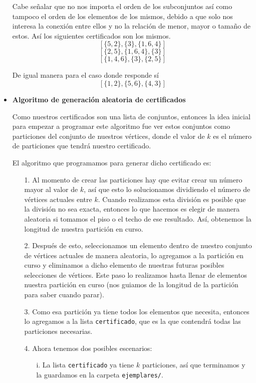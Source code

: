 \documentclass[12pt,letterpaper]{article}
\begin{document}
\begin{itemize}
    Cabe señalar que no nos importa el orden de los subconjuntos así como tampoco el orden de los elementos de los mismos, debido a que solo nos interesa la conexión entre ellos y no la relación de menor, mayor o tamaño de estos. Así los siguientes certificados son los mismos.
    $$[\{5,2\},\{3\},\{1,6,4\}]$$
    $$[\{2,5\},\{1,6,4\},\{3\}]$$
    $$[\{1,4,6\},\{3\},\{2,5\}]$$
    
    De igual manera para el caso donde responde sí
    $$[\{1,2\},\{5,6\},\{4,3\}]$$

    \item \textbf{Algoritmo de generación aleatoria de certificados}
    
    Como nuestros certificados son una lista de conjuntos, entonces la idea 
    inicial para empezar a programar este algoritmo fue ver estos conjuntos 
    como particiones del conjunto de nuestros vértices, donde el valor de 
    $k$ es el número de particiones que tendrá nuestro certificado.

    El algoritmo que programamos para generar dicho certificado es:
    \begin{itemize}
        \item[1.] Al momento de crear las particiones hay que evitar crear un 
        número mayor al valor de $k$, así que esto lo solucionamos dividiendo 
        el número de vértices actuales entre $k$. Cuando realizamos esta 
        división es posible que la división no sea exacta, entonces lo que 
        hacemos es elegir de manera aleatoria si tomamos el piso o el techo de 
        ese resultado. Así, obtenemos la longitud de nuestra partición en curso. 

        \item[2.] Después de esto, seleccionamos un elemento dentro de nuestro 
        conjunto de vértices actuales de manera aleatoria, lo agregamos a la 
        partición en curso y eliminamos a dicho elemento de nuestras 
        futuras posibles selecciones de vértices. Este paso lo realizamos 
        hasta llenar de elementos nuestra partición en curso (nos guiamos 
        de la longitud de la partición para saber cuando parar). 

        \item[3.] Como esa partición ya tiene todos los elementos que necesita, 
        entonces lo agregamos a la lista \texttt{certificado}, que es la 
        que contendrá todas las particiones necesarias. 

        \item[4.] Ahora tenemos dos posibles escenarios:
        \begin{itemize}
            \item[i.] La lista \texttt{certificado} ya tiene $k$ particiones, 
            así que terminamos y la guardamos en la carpeta \texttt{ejemplares/}.


\end{itemize}
\end{itemize}
\end{itemize}
\end{document}
